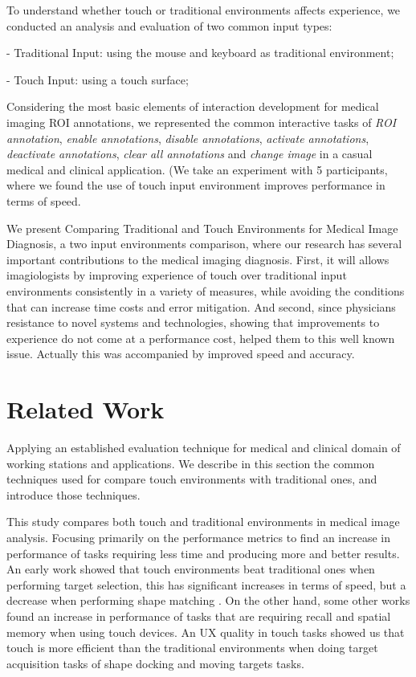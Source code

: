 \documentclass{sigchi}
\begin{document}
To understand whether touch or traditional environments affects experience, we conducted an analysis and evaluation of two common input types:

- Traditional Input: using the mouse and keyboard as traditional environment;

- Touch Input: using a touch surface;

Considering the most basic elements of interaction development for medical imaging ROI annotations, we represented the common interactive tasks of \textit{ROI annotation}, \textit{enable annotations}, \textit{disable annotations}, \textit{activate annotations}, \textit{deactivate annotations}, \textit{clear all annotations} and \textit{change image} in a casual medical and clinical application. (We take an experiment with 5 participants, where we found the use of touch input environment improves performance in terms of speed.

We present Comparing Traditional and Touch Environments for Medical Image Diagnosis, a two input environments comparison, where our research has several important contributions to the medical imaging diagnosis. First, it will allows imagiologists by improving experience of touch over traditional input environments consistently in a variety of measures, while avoiding the conditions that can increase time costs and error mitigation. And second, since physicians resistance to novel systems and technologies, showing that improvements to experience do not come at a performance cost, helped them to this well known issue. Actually this was accompanied by improved speed and accuracy.

\section{Related Work}

Applying an established evaluation technique for medical and clinical domain of working stations and applications. We describe in this section the common techniques used for compare touch environments with traditional ones, and introduce those techniques.

This study compares both touch and traditional environments in medical image analysis. Focusing primarily on the performance metrics to find an increase in performance of tasks requiring less time and producing more and better results. An early work \cite{shanis2003comparison} showed that touch environments beat traditional ones when performing target selection, this has significant increases in terms of speed, but a decrease when performing shape matching \cite{forlines2007direct}. On the other hand, some other works \cite{tan2002kinesthetic, wallace1972spatial} found an increase in performance of tasks that are requiring recall and spatial memory when using touch devices. An UX quality in touch tasks showed us that touch is more efficient than the traditional environments when doing target acquisition tasks of shape docking and moving targets tasks.
\end{document}
